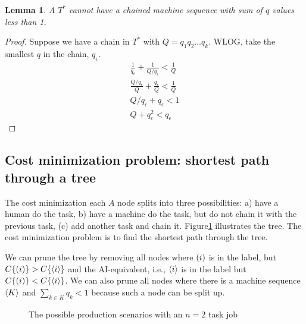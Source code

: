 \documentclass{article}
\newtheorem{lemma}[theorem]{Lemma}
\begin{document}
\begin{lemma}
A $T^*$ cannot have a chained machine sequence with sum of $q$ values less than 1.
\end{lemma}
\begin{proof}
Suppose we have a chain in $T^*$ with $Q = q_1 q_2\ldots q_k$.
WLOG, take the smallest $q$ in the chain, $q_\epsilon$.
\begin{align}
 \frac{1}{q_{\epsilon}} + \frac{1}{Q/q_{\epsilon}} < \frac{1}{Q}\\
 \frac{Q/q_{\epsilon}}{Q} + \frac{q_{\epsilon}}{Q} < \frac{1}{Q}\\
 Q/q_{\epsilon} + q_{\epsilon} < 1 \\
 Q + q_\epsilon^2 < q_{\epsilon}
\end{align}

\end{proof}

\subsection{Cost minimization problem: shortest path through a tree}
The cost minimization each $A$ node splits into three possibilities: a) have a human do the task, b) have a machine do the task, but do not chain it with the previous task, (c) add another task and chain it. 
Figure\ref{fig:tree} illustrates the tree. 
The cost minimization problem is to find the shortest path through the tree. 

We can prune the tree by removing all nodes where $( i )$ is in the label, but $C\{ ( i ) \} > C\{ \langle i \rangle \}$ and the AI-equivalent, i.e., $\langle i \rangle$ is in the label but $C\{ ( i ) \} < C\{ \langle i \rangle \}$.
We can also prune all nodes where there is a machine sequence $\langle K \rangle$ and $\sum_{k \in K} q_k < 1$ because such a node can be split up.

\begin{figure}
\caption{The possible production scenarios with an $n=2$ task job}
\label{fig:tree}
\end{figure}
\end{document}
